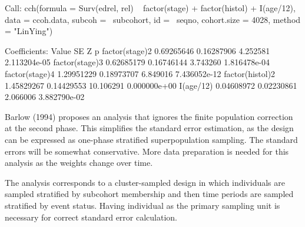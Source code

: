 \documentclass{article}
\begin{document}
\begin{Schunk}
\begin{Soutput}
Call: cch(formula = Surv(edrel, rel) ~ factor(stage) + factor(histol) + 
    I(age/12), data = ccoh.data, subcoh = ~subcohort, id = ~seqno, 
    cohort.size = 4028, method = "LinYing")

Coefficients:
                     Value         SE         Z            p
factor(stage)2  0.69265646 0.16287906  4.252581 2.113204e-05
factor(stage)3  0.62685179 0.16746144  3.743260 1.816478e-04
factor(stage)4  1.29951229 0.18973707  6.849016 7.436052e-12
factor(histol)2 1.45829267 0.14429553 10.106291 0.000000e+00
I(age/12)       0.04608972 0.02230861  2.066006 3.882790e-02
\end{Soutput}
\end{Schunk}


Barlow (1994) proposes an analysis that ignores the finite population
correction at the second phase.  This simplifies the standard error
estimation, as the design can be expressed as one-phase stratified
superpopulation sampling. The standard errors will be somewhat
conservative. More data preparation is needed for this analysis as the
weights change over time.
\begin{Schunk}
\end{Schunk}

The analysis corresponds to a cluster-sampled design in which
individuals are sampled stratified by subcohort membership and then
time periods are sampled stratified by event status.  Having
individual as the primary sampling unit is necessary for correct
standard error calculation. 
\end{document}
